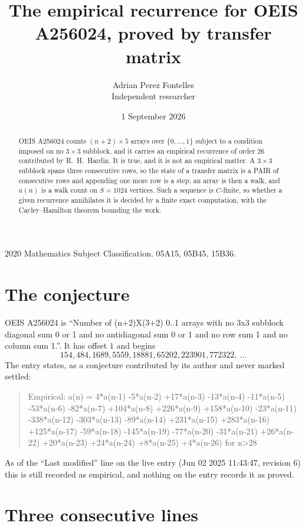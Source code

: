 \documentclass[11pt,a4paper]{article}
\title{The empirical recurrence for OEIS A256024, proved by transfer matrix}
\author{Adrian Perez Fontelles\\ \small Independent researcher}
\date{1 September 2026}
\theoremstyle{plain}
\theoremstyle{definition}
\begin{document}
\maketitle

\begin{abstract}
OEIS A256024 counts $(n+2)\times5$ arrays over $\{0,\dots,1\}$ subject to a condition imposed on
no $3\times3$ subblock, and it carries an empirical recurrence of order $26$
contributed by R.~H.~Hardin. It is true, and it is not an empirical matter. A $3\times3$
subblock spans three consecutive rows, so the state of a transfer matrix is a PAIR of
consecutive rows and appending one more row is a step; an array is then a walk, and
$a(n)$ is a walk count on $S=1024$ vertices. Such a sequence is $C$-finite, so whether a given
recurrence annihilates it is decided by a finite exact computation, with the Cayley--Hamilton
theorem bounding the work.
\end{abstract}

\noindent\small 2020 Mathematics Subject Classification. 05A15, 05B45, 15B36.\normalsize

\section{The conjecture}

OEIS A256024 is ``Number of (n+2)X(3+2) 0..1 arrays with no 3x3 subblock diagonal sum 0 or 1 and no antidiagonal sum 0 or 1 and no row sum 1 and no column sum 1.''. It has offset $1$ and begins
\[
154, 484, 1689, 5559, 18881, 65202, 223901, 772322,\ \dots
\]
The entry states, as a conjecture contributed by its author and never marked settled:
\begin{quote}
Empirical: a(n) = 4*a(n-1) -5*a(n-2) +17*a(n-3) -13*a(n-4) -11*a(n-5) -53*a(n-6) -82*a(n-7) +104*a(n-8) +226*a(n-9) +158*a(n-10) -23*a(n-11) -338*a(n-12) -303*a(n-13) -89*a(n-14) +231*a(n-15) +283*a(n-16) +125*a(n-17) -59*a(n-18) -145*a(n-19) -77*a(n-20) -31*a(n-21) +26*a(n-22) +20*a(n-23) +24*a(n-24) +8*a(n-25) +4*a(n-26) for n>28
\end{quote}
As of the ``Last modified'' line on the live entry (Jun 02 2025 11:43:47, revision 6) this is still
recorded as empirical, and nothing on the entry records it as proved.

\section{Three consecutive lines}
\end{document}
